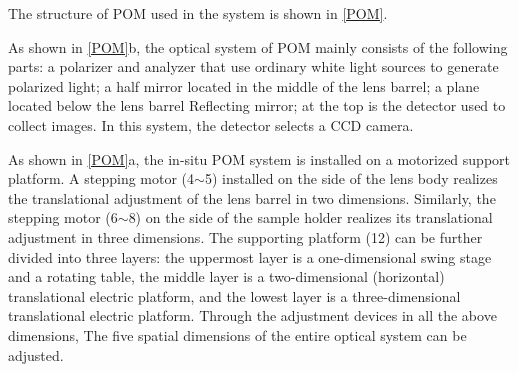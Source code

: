 \documentclass{Head}
\begin{document}
The structure of POM used in the system is shown in \autoref{POM}.


As shown in \autoref{POM}b, the optical system of POM mainly consists of the following parts: a polarizer and analyzer that use ordinary white light sources to generate polarized light; a half mirror located in the middle of the lens barrel; a plane located below the lens barrel Reflecting mirror; at the top is the detector used to collect images. In this system, the detector selects a CCD camera.


As shown in \autoref{POM}a, the in-situ POM system is installed on a motorized support platform.
A stepping motor (4$\sim$5) installed on the side of the lens body realizes the translational adjustment of the lens barrel in two dimensions.
Similarly, the stepping motor (6$\sim$8) on the side of the sample holder realizes its translational adjustment in three dimensions.
The supporting platform (12) can be further divided into three layers: the uppermost layer is a one-dimensional swing stage and a rotating table, the middle layer is a two-dimensional (horizontal) translational electric platform, and the lowest layer is a three-dimensional translational electric platform.
Through the adjustment devices in all the above dimensions, The five spatial dimensions of the entire optical system can be adjusted.
\end{document}
